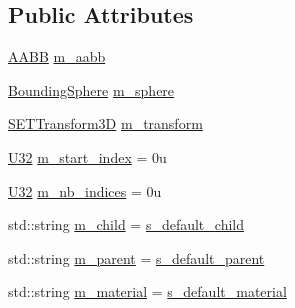 \subsection*{Public Attributes}
\begin{DoxyCompactItemize}
\item 
\mbox{\hyperlink{classmage_1_1_a_a_b_b}{A\+A\+BB}} \mbox{\hyperlink{structmage_1_1rendering_1_1_model_part_a69f7f90a31e48a286fecebc9e680b5ef}{m\+\_\+aabb}}
\item 
\mbox{\hyperlink{classmage_1_1_bounding_sphere}{Bounding\+Sphere}} \mbox{\hyperlink{structmage_1_1rendering_1_1_model_part_aa2204e02fe90f993990cdda677bff6e7}{m\+\_\+sphere}}
\item 
\mbox{\hyperlink{classmage_1_1_s_e_t_transform3_d}{S\+E\+T\+Transform3D}} \mbox{\hyperlink{structmage_1_1rendering_1_1_model_part_aaa352b502962fa1e572d3b6b0092cd08}{m\+\_\+transform}}
\item 
\mbox{\hyperlink{namespacemage_aa5d6eaabaac3cdd01873d6a3d27e90f3}{U32}} \mbox{\hyperlink{structmage_1_1rendering_1_1_model_part_a251d19417a0b4abe98faeae767b9fef4}{m\+\_\+start\+\_\+index}} = 0u
\item 
\mbox{\hyperlink{namespacemage_aa5d6eaabaac3cdd01873d6a3d27e90f3}{U32}} \mbox{\hyperlink{structmage_1_1rendering_1_1_model_part_a6e622f4bcb1ada388c3ee489c22e4547}{m\+\_\+nb\+\_\+indices}} = 0u
\item 
std\+::string \mbox{\hyperlink{structmage_1_1rendering_1_1_model_part_ad62194df918560d18de5e311b26eabfc}{m\+\_\+child}} = \mbox{\hyperlink{structmage_1_1rendering_1_1_model_part_a3571b142c7948d7ab5af699799c69b42}{s\+\_\+default\+\_\+child}}
\item 
std\+::string \mbox{\hyperlink{structmage_1_1rendering_1_1_model_part_ac2e8e1a53ded91cf4e0439c15b63ab07}{m\+\_\+parent}} = \mbox{\hyperlink{structmage_1_1rendering_1_1_model_part_ab6747ba3fd20c9f55f1d9bb7a64033e5}{s\+\_\+default\+\_\+parent}}
\item 
std\+::string \mbox{\hyperlink{structmage_1_1rendering_1_1_model_part_abe5c6a98f2c039f2a20e9f6d1842f71b}{m\+\_\+material}} = \mbox{\hyperlink{structmage_1_1rendering_1_1_model_part_a833762db3fb81dd2086e9b89da158b12}{s\+\_\+default\+\_\+material}}
\end{DoxyCompactItemize}
